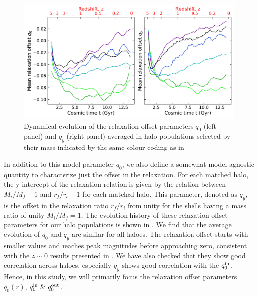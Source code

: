 \begin{figure}[htbp]
\centering
\includegraphics[width=\linewidth]{plots/dynam_relxn/hal_relxn_offset_evolve.pdf}    \caption{Dynamical evolution of the relaxation offset parameters $q_0$ (left panel) and $q_y$ (right panel) averaged in halo populations selected by their mass indicated by the same colour coding as in }
\label{fig:evolution-hal-reln-offset}
\end{figure}
In addition to this model parameter $q_0$, we also define a somewhat model-agnostic quantity to characterize just the offset in the relaxation. For each matched halo, the y-intercept of the relaxation relation is given by the relation between $M_i/M_f-1$ and $r_f/r_i-1$ for each matched halo. This parameter, denoted as $q_y$, is the offset in the relaxation ratio $r_f/r_i$ from unity for the shells having a mass ratio of unity $M_i/M_f=1$. The evolution history of these relaxation offset parameters for our halo populations is shown in . We find that the average evolution of $q_0$ and $q_y$ are similar for all haloes. The relaxation offset starts with smaller values and reaches peak magnitudes before approaching zero, consistent with the $z \sim 0$ results presented in . We have also checked that they show good correlation across haloes, especially $q_y$ shows good correlation with the $q_0^{\rm{in}}$. Hence, in this study, we will primarily focus the relaxation offset parameters $q_0(r)$,  $q_0^{\rm{in}} ~\& ~q_0^{\rm{out}}$.





